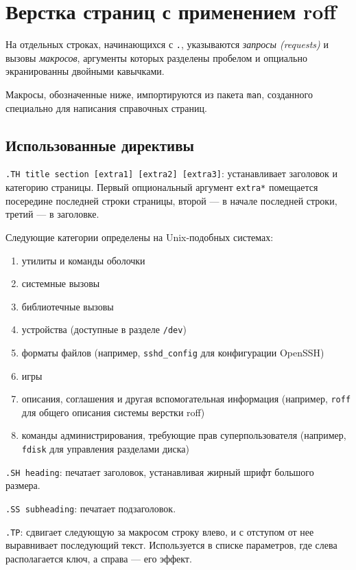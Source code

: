 \documentclass[listings]{labreport}
\begin{document}
\maketitlepage

\section*{Верстка страниц с применением roff}

На отдельных строках, начинающихся с \texttt{.}, указываются \textit{запросы (requests)} и
вызовы \textit{макросов}, аргументы которых разделены пробелом и опциально экранированны
двойными кавычками.

Макросы, обозначенные ниже, импортируются из пакета \texttt{man}, созданного специально
для написания справочных страниц.

\subsection*{Использованные директивы}

\texttt{.TH title section [extra1] [extra2] [extra3]}: устанавливает заголовок и категорию страницы.
Первый опциональный аргумент \texttt{extra*} помещается посередине последней строки страницы,
второй — в начале последней строки, третий — в заголовке.

Следующие категории определены на Unix-подобных системах:

\begin{enumerate}
\item утилиты и команды оболочки
\item системные вызовы
\item библиотечные вызовы
\item устройства (доступные в разделе \texttt{/dev})
\item форматы файлов (например, \texttt{sshd\_config} для конфигурации OpenSSH)
\item игры
\item описания, соглашения и другая вспомогательная информация (например, \texttt{roff} для общего описания системы верстки roff)
\item команды администрирования, требующие прав суперпользователя (например, \texttt{fdisk} для управления разделами диска)
\end{enumerate}

\texttt{.SH heading}: печатает заголовок, устанавливая жирный шрифт большого размера.

\texttt{.SS subheading}: печатает подзаголовок.

\texttt{.TP}: сдвигает следующую за макросом строку влево, и с отступом от нее выравнивает последующий текст.
Используется в списке параметров, где слева располагается ключ, а справа — его эффект.
\end{document}
